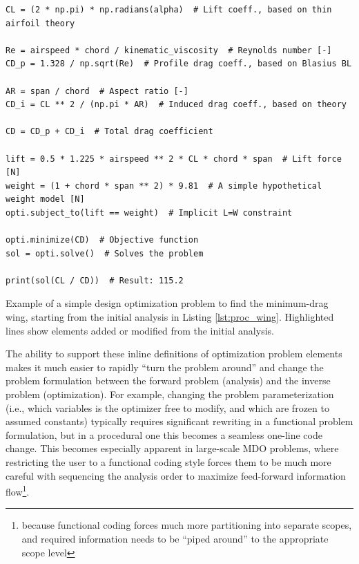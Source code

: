 \begin{enumerate}
\begin{listing}[H]
\begin{verbatim}
CL = (2 * np.pi) * np.radians(alpha)  # Lift coeff., based on thin airfoil theory

Re = airspeed * chord / kinematic_viscosity  # Reynolds number [-]
CD_p = 1.328 / np.sqrt(Re)  # Profile drag coeff., based on Blasius BL

AR = span / chord  # Aspect ratio [-]
CD_i = CL ** 2 / (np.pi * AR)  # Induced drag coeff., based on theory

CD = CD_p + CD_i  # Total drag coefficient

lift = 0.5 * 1.225 * airspeed ** 2 * CL * chord * span  # Lift force [N]
weight = (1 + chord * span ** 2) * 9.81  # A simple hypothetical weight model [N]
opti.subject_to(lift == weight)  # Implicit L=W constraint

opti.minimize(CD)  # Objective function
sol = opti.solve()  # Solves the problem

print(sol(CL / CD))  # Result: 115.2
        \end{verbatim}
        \caption{Example of a simple design optimization problem to find the minimum-drag wing, starting from the initial analysis in Listing \ref{lst:proc_wing}. Highlighted lines show elements added or modified from the initial analysis.}
        \label{lst:proc_wing_opt}
    \end{listing}

    The ability to support these inline definitions of optimization problem elements makes it much easier to rapidly ``turn the problem around'' and change the problem formulation between the forward problem (analysis) and the inverse problem (optimization). For example, changing the problem parameterization (i.e., which variables is the optimizer free to modify, and which are frozen to assumed constants) typically requires significant rewriting in a functional problem formulation, but in a procedural one this becomes a seamless one-line code change. This becomes especially apparent in large-scale MDO problems, where restricting the user to a functional coding style forces them to be much more careful with sequencing the analysis order to maximize feed-forward information flow\footnote{because functional coding forces much more partitioning into separate scopes, and required information needs to be ``piped around'' to the appropriate scope level}.

\end{enumerate}

